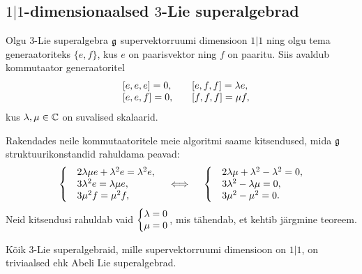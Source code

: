 
\subsection{\texorpdfstring{$1|1$}{1|1}-dimensionaalsed
    \texorpdfstring{$3$}{3}-Lie superalgebrad}

Olgu $3$-Lie superalgebra $\mathfrak{g}$ supervektorruumi dimensioon
$1|1$ ning olgu tema generaatoriteks $\{ e, f \}$, kus $e$ on paarisvektor
ning $f$ on paaritu. Siis avaldub kommutaator generaatoritel
\begin{align*}
    \begin{matrix*}[l]
        &[e, e, e] = 0,\quad
        &[e, f, f] = \l e, \\
        &[e, e, f] = 0,\quad
        &[f, f, f] = \m f,
    \end{matrix*}
\end{align*}
kus $\lambda, \mu \in \mathbb{C}$ on suvalised skalaarid.

Rakendades neile kommutaatoritele meie algoritmi saame kitsendused,
mida $\mathfrak{g}$ struktuurikonstandid rahuldama peavad:
\begin{align*}
    \left\{
        \begin{matrix*}[l]
            &2\l\m e + \l^2 e =  \l^2 e, \\
            &3\l^2 e = \l\m e, \\
            &3\m^2 f = \m^2 f,
        \end{matrix*}
    \right.
    \quad \iff \quad
    \left\{
        \begin{matrix*}[l]
            &2\l\m + \l^2 - \l^2 = 0, \\
            &3\l^2 - \l\m = 0, \\
            &3\m^2 - \m^2 = 0.
        \end{matrix*}
    \right.
\end{align*}
Neid kitsendusi rahuldab vaid
$\left\{ \begin{matrix} \lambda = 0 \\ \mu = 0 \end{matrix} \right.$,
mis tähendab, et kehtib järgmine teoreem.

\begin{thm}
    Kõik $3$-Lie superalgebraid, mille supervektorruumi dimensioon on $1|1$,
    on triviaalsed ehk Abeli Lie superalgebrad.
\end{thm}
